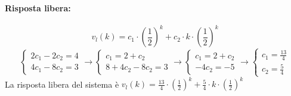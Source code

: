 \documentclass[a4paper]{article}
\begin{document}
	\paragraph{Risposta libera:}
	\[ v_l(k) = c_1 \cdot \left( \frac{1}{2} \right)^k + c_2 \cdot k \cdot \left( \frac{1}{2} \right)^k \]
	\[
	\begin{cases}
		2c_1 - 2c_2 = 4 \\
		4c_1 - 8c_2 = 3
	\end{cases}
	\longrightarrow
	\begin{cases}
		c_1 = 2 + c_2 \\
		8 + 4c_2 - 8c_2 = 3
	\end{cases}
	\longrightarrow
	\begin{cases}
		c_1 = 2 + c_2 \\
		-4c_2 = -5
	\end{cases}
	\longrightarrow
	\begin{cases}
		c_1 = \frac{13}{4} \\
		c_2 = \frac{5}{4}
	\end{cases}
	\]
	La risposta libera del sistema è $v_l(k) = \frac{13}{4} \cdot \left( \frac{1}{2} \right)^k + \frac{5}{4} \cdot k \cdot \left( \frac{1}{2} \right)^k$
	
\end{document}
